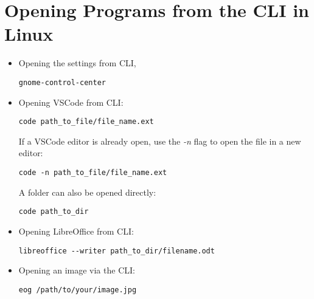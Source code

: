 \documentclass[12pt, a4paper]{scrbook}
\numberwithin{equation}{section}
\theoremstyle{definition}
\theoremstyle{definition}
\begin{document}
	\chapter{Opening Programs from the CLI in Linux}
		
		\begin{itemize}
			\item Opening the settings from CLI, 
			
			\begin{lstlisting}[style=mystylebash, label=alg:cli_settings, xleftmargin=\parindent]
				gnome-control-center
			\end{lstlisting}
			
			\item Opening VSCode from CLI: 
			
			\begin{lstlisting}[style=mystylebash, label=alg:ubuntu__vscode_file, xleftmargin=\parindent]
				code path_to_file/file_name.ext
			\end{lstlisting}
			
			If a VSCode editor is already open, use the \textit{-n} flag to open the file in a new editor:
			
			\begin{lstlisting}[style=mystylebash, label=alg:ubuntu__vscode_file_new_editor, xleftmargin=\parindent]
				code -n path_to_file/file_name.ext
			\end{lstlisting}
			
			A folder can also be opened directly:
			\begin{lstlisting}[style=mystylebash, label=alg:ubuntu__vscode_dir, caption=Opening VSCode dir from CLI, xleftmargin=\parindent]
				code path_to_dir
			\end{lstlisting}
			
			\item Opening LibreOffice from CLI:
			
			\begin{lstlisting}[style=mystylebash, label=alg:ubuntu__libre_office, xleftmargin=\parindent]
				libreoffice --writer path_to_dir/filename.odt
			\end{lstlisting}
			
			\item Opening an image via the CLI: 
			
			\begin{lstlisting}[style=mystylebash, label=alg:ubuntu_eog, xleftmargin=\parindent]
				eog /path/to/your/image.jpg
			\end{lstlisting}
			
		\end{itemize}
\end{document}
